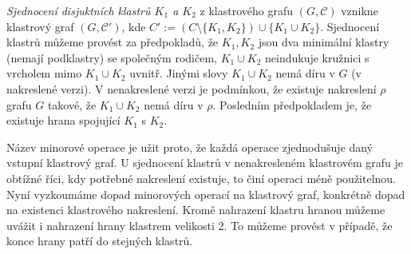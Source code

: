 \begin{defn}
\textit{Sjednocení disjuktních klastrů $K_1$ a $K_2$} z klastrového grafu $(G, \mathcal C)$ vznikne klastrový graf  $(G, \mathcal C')$, kde $C'  := (C\setminus \{K_1,K_2\}) \cup \{K_1 \cup K_2\}$. Sjednocení klastrů můžeme provést za předpokladů, že $K_1, K_2$ jsou dva minimální klastry (nemají podklastry) se společným rodičem, $K_1 \cup K_2$ neindukuje kružnici s vrcholem mimo $K_1 \cup K_2$ uvnitř. Jinými slovy $K_1 \cup K_2$ nemá díru v $G$ (v nakreslené verzi). V nenakreslené verzi je podmínkou, že existuje nakreslení $\rho$ grafu $G$ takové, že $K_1 \cup K_2$ nemá díru v $\rho$. Posledním předpokladem je, že existuje hrana spojující $K_1$ s $K_2$.
\end{defn}

Název minorové operace je užit proto, že každá operace zjednodušuje daný vstupní klastrový graf. U sjednocení klastrů v nenakresleném klastrovém grafu je obtížné říci, kdy potřebné nakreslení existuje, to činí operaci méně použitelnou.
Nyní vyzkoumáme dopad minorových operací na klastrový graf, konkrétně dopad na existenci klastrového nakreslení. Kromě nahrazení klastru hranou můžeme uvážit i nahrazení hrany klastrem velikosti 2. To můžeme provést v případě, že konce hrany patří do stejných klastrů.

